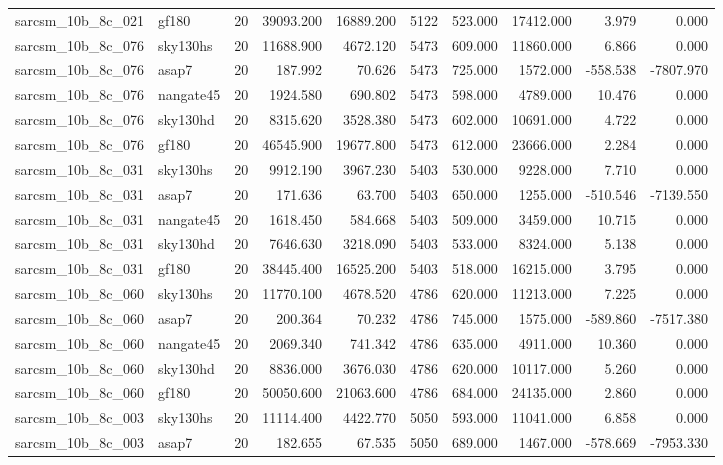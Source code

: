 \begin{longtable}{llrrrrrrrr}
sarcsm\_10b\_8c\_021 & gf180 & 20 & 39093.200 & 16889.200 & 5122 & 523.000 & 17412.000 & 3.979 & 0.000 \\
sarcsm\_10b\_8c\_076 & sky130hs & 20 & 11688.900 & 4672.120 & 5473 & 609.000 & 11860.000 & 6.866 & 0.000 \\
sarcsm\_10b\_8c\_076 & asap7 & 20 & 187.992 & 70.626 & 5473 & 725.000 & 1572.000 & -558.538 & -7807.970 \\
sarcsm\_10b\_8c\_076 & nangate45 & 20 & 1924.580 & 690.802 & 5473 & 598.000 & 4789.000 & 10.476 & 0.000 \\
sarcsm\_10b\_8c\_076 & sky130hd & 20 & 8315.620 & 3528.380 & 5473 & 602.000 & 10691.000 & 4.722 & 0.000 \\
sarcsm\_10b\_8c\_076 & gf180 & 20 & 46545.900 & 19677.800 & 5473 & 612.000 & 23666.000 & 2.284 & 0.000 \\
sarcsm\_10b\_8c\_031 & sky130hs & 20 & 9912.190 & 3967.230 & 5403 & 530.000 & 9228.000 & 7.710 & 0.000 \\
sarcsm\_10b\_8c\_031 & asap7 & 20 & 171.636 & 63.700 & 5403 & 650.000 & 1255.000 & -510.546 & -7139.550 \\
sarcsm\_10b\_8c\_031 & nangate45 & 20 & 1618.450 & 584.668 & 5403 & 509.000 & 3459.000 & 10.715 & 0.000 \\
sarcsm\_10b\_8c\_031 & sky130hd & 20 & 7646.630 & 3218.090 & 5403 & 533.000 & 8324.000 & 5.138 & 0.000 \\
sarcsm\_10b\_8c\_031 & gf180 & 20 & 38445.400 & 16525.200 & 5403 & 518.000 & 16215.000 & 3.795 & 0.000 \\
sarcsm\_10b\_8c\_060 & sky130hs & 20 & 11770.100 & 4678.520 & 4786 & 620.000 & 11213.000 & 7.225 & 0.000 \\
sarcsm\_10b\_8c\_060 & asap7 & 20 & 200.364 & 70.232 & 4786 & 745.000 & 1575.000 & -589.860 & -7517.380 \\
sarcsm\_10b\_8c\_060 & nangate45 & 20 & 2069.340 & 741.342 & 4786 & 635.000 & 4911.000 & 10.360 & 0.000 \\
sarcsm\_10b\_8c\_060 & sky130hd & 20 & 8836.000 & 3676.030 & 4786 & 620.000 & 10117.000 & 5.260 & 0.000 \\
sarcsm\_10b\_8c\_060 & gf180 & 20 & 50050.600 & 21063.600 & 4786 & 684.000 & 24135.000 & 2.860 & 0.000 \\
sarcsm\_10b\_8c\_003 & sky130hs & 20 & 11114.400 & 4422.770 & 5050 & 593.000 & 11041.000 & 6.858 & 0.000 \\
sarcsm\_10b\_8c\_003 & asap7 & 20 & 182.655 & 67.535 & 5050 & 689.000 & 1467.000 & -578.669 & -7953.330 \\

\end{longtable}
